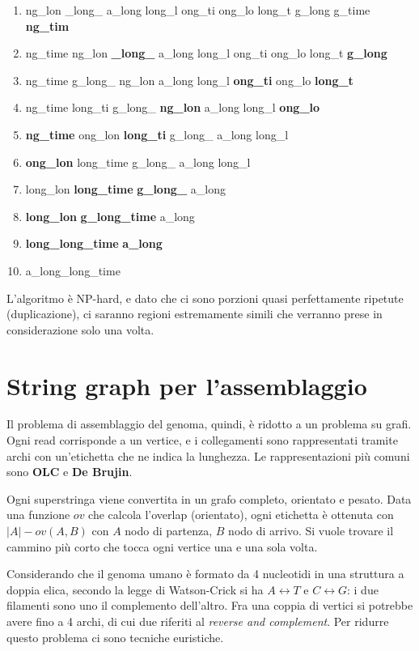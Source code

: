 \begin{enumerate}
	\item ng\_lon \_long\_ a\_long long\_l ong\_ti ong\_lo long\_t g\_long g\_time \textbf{ng\_tim}
	\item ng\_time ng\_lon \textbf{\_long\_} a\_long long\_l ong\_ti ong\_lo long\_t \textbf{g\_long}
	\item ng\_time g\_long\_ ng\_lon a\_long long\_l \textbf{ong\_ti} ong\_lo \textbf{long\_t}
	\item ng\_time long\_ti g\_long\_ \textbf{ng\_lon} a\_long long\_l \textbf{ong\_lo}
	\item \textbf{ng\_time} ong\_lon \textbf{long\_ti} g\_long\_ a\_long long\_l
	\item \textbf{ong\_lon} long\_time g\_long\_ a\_long long\_l
	\item long\_lon \textbf{long\_time} \textbf{g\_long\_} a\_long
	\item \textbf{long\_lon} \textbf{g\_long\_time} a\_long
	\item \textbf{long\_long\_time} \textbf{a\_long}
	\item a\_long\_long\_time
\end{enumerate}

L'algoritmo è NP-hard, e dato che ci sono porzioni quasi perfettamente ripetute (duplicazione), ci saranno regioni estremamente simili che verranno prese in considerazione solo una volta.

\newpage
\section{String graph per l'assemblaggio}
Il problema di assemblaggio del genoma, quindi, è ridotto a un problema su grafi. Ogni read corrisponde a un vertice, e i collegamenti sono rappresentati tramite archi con un'etichetta che ne indica la lunghezza. Le rappresentazioni più comuni sono \textbf{OLC} e \textbf{De Brujin}.

Ogni superstringa viene convertita in un grafo completo, orientato e pesato. Data una funzione $ov$ che calcola l'overlap (orientato), ogni etichetta è ottenuta con $|A| - ov(A, B)$ con $A$ nodo di partenza, $B$ nodo di arrivo. Si vuole trovare il cammino più corto che tocca ogni vertice una e una sola volta.

Considerando che il genoma umano è formato da 4 nucleotidi in una struttura a doppia elica, secondo la legge di Watson-Crick si ha $A \leftrightarrow T$ e $C \leftrightarrow G$: i due filamenti sono uno il complemento dell'altro. Fra una coppia di vertici si potrebbe avere fino a 4 archi, di cui due riferiti al \textit{reverse and complement}. Per ridurre questo problema ci sono tecniche euristiche.

